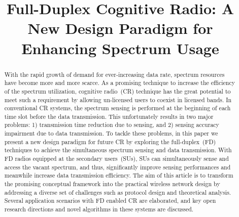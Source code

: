 \documentclass[onecolumn,12pt]{IEEEtran}
\begin{document}
\title{Full-Duplex Cognitive Radio: A New Design Paradigm for Enhancing Spectrum Usage}

\author{
}


\maketitle

\thispagestyle{empty}
\begin{abstract}
With the rapid growth of demand for ever-increasing data rate, spectrum resources have become more and more scarce. As a promising technique to increase the efficiency of the spectrum utilization, cognitive radio~(CR) technique has the great potential to meet such a requirement by allowing un-licensed users to coexist in licensed bands. In conventional CR systems, the spectrum sensing is performed at the beginning of each time slot before the data transmission. This unfortunately results in two major problems: 1) transmission time reduction due to sensing, and 2) sensing accuracy impairment due to data transmission. To tackle these problems, in this paper we present a new design paradigm for future CR by exploring the full-duplex~(FD) techniques to achieve the simultaneous spectrum sensing and data transmission. With FD radios equipped at the secondary users~(SUs), SUs can simultaneously sense and access the vacant spectrum, and thus, significantly improve sensing performances and meanwhile increase data transmission efficiency. The aim of this article is to transform the promising conceptual framework into the practical wireless network design by addressing a diverse set of challenges such as protocol design and theoretical analysis. Several application scenarios with FD enabled CR are elaborated, and key open research directions and novel algorithms in these systems are discussed.
\end{abstract}
\end{document}
